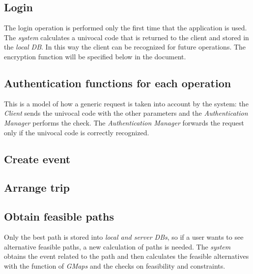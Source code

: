\subsection{Login}
			\noindent{}
			The login operation is performed only the first time that the application is used. 
			The \textit{system} calculates a univocal code that is returned to the client and stored in the \textit{local DB}. In this way the client can be recognized for future operations. 
			The encryption function will be specified below in the document.
\subsection{Authentication functions for each operation}
		\noindent{}
		This is a model of how a generic request is taken into account by the system: the \textit{Client} sends the univocal code with the other parameters and the \textit{Authentication Manager} performs the check. 
		The \textit{Authentication Manager} forwards the request only if the univocal code is correctly recognized.
\subsection{Create event}
		\noindent{}
\subsection{Arrange trip}
		\noindent{}
\subsection{Obtain feasible paths}
		\noindent{}
		Only the best path is stored into \textit{local and server DBs}, so if a user wants to see alternative feasible paths, a new calculation of paths is needed. 
		The \textit{system} obtains the event related to the path and then calculates the feasible alternatives with the function of \textit{GMaps} and the checks on feasibility and constraints.

